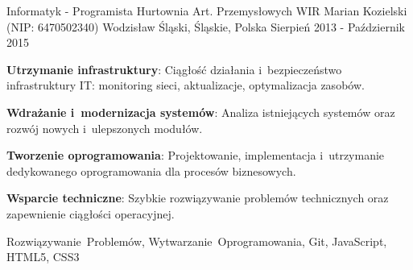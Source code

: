 \begin{cventries}
\cventry
{Informatyk - Programista} %
{Hurtownia Art. Przemysłowych WIR Marian Kozielski (NIP: 6470502340)} %
{Wodzisław Śląski, Śląskie, Polska} %
{Sierpień 2013 - Październik 2015} %
{
  \begin{cvitems} %
    \item {\textbf{Utrzymanie infrastruktury}: Ciągłość działania i~bezpieczeństwo infrastruktury IT: monitoring sieci, aktualizacje, optymalizacja zasobów.}
    \item {\textbf{Wdrażanie i~modernizacja systemów}: Analiza istniejących systemów oraz rozwój nowych i~ulepszonych modułów.}
    \item {\textbf{Tworzenie oprogramowania}: Projektowanie, implementacja i~utrzymanie dedykowanego oprogramowania dla procesów biznesowych.}
    \item {\textbf{Wsparcie techniczne}: Szybkie rozwiązywanie problemów technicznych oraz zapewnienie ciągłości operacyjnej.}
  \end{cvitems}
}
{Rozwiązywanie~Problemów, Wytwarzanie~Oprogramowania, Git, JavaScript, HTML5, CSS3}

\end{cventries}
